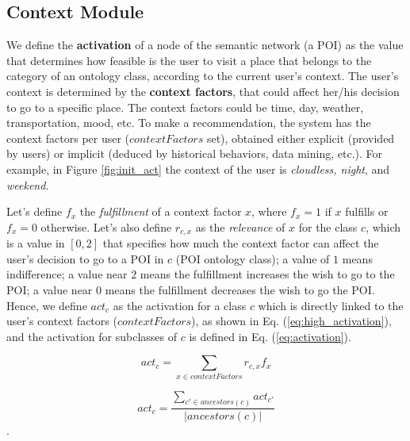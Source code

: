 \subsection{Context Module}
We define the \textbf{activation} of a node of the semantic network (a POI) as the value that determines how feasible 
is the user to visit a place that belongs to the category of  an 
ontology class, according to the current user's context.
The user's context is determined by the \textbf{context factors}, 
that could affect her/his  decision to go to a specific place. The context factors could be time, day, weather, transportation, mood, etc. To make a recommendation, the system has the
context factors per user ($contextFactors$ set), obtained either explicit (provided by users) or implicit (deduced by historical behaviors, data mining, etc.).  For example, in Figure \ref{fig:init_act} the context of the user is
\textit{cloudless, night}, and \textit{weekend}.

Let's define $f_x$ the \textit{fulfillment} of a context factor 
$x$, where $f_x = 1$ if $x$ fulfills or $f_x = 0$ otherwise. Let's also define $r_{c,x}$ as the \textit{relevance} of $x$ for the class $c$, which is a value in $[0, 2]$ that specifies how much the context factor %
can affect the user's decision to go to a POI in $c$ (POI ontology class); a value of $1$ means indifference; a value near $2$ means the fulfillment increases the wish to go to the POI; a value near $0$ means the fulfillment decreases the wish to go the POI. Hence, we define $act_c$ as the activation for a class $c$ which is directly linked to the user's context factors 
($contextFactors$), as shown in Eq. (\ref{eq:high_activation}), and the activation for subclasses of $c$
is defined in Eq. (\ref{eq:activation}).


\begin{equation} \label{eq:high_activation}
    act_c = \sum_{x \in contextFactors} r_{c,x} f_x
\end{equation}


\begin{equation} \label{eq:activation}
    act_c = \frac{\displaystyle \sum_{c' \in ancestors(c)} act_{c'}}{|ancestors(c)|}
\end{equation}.

